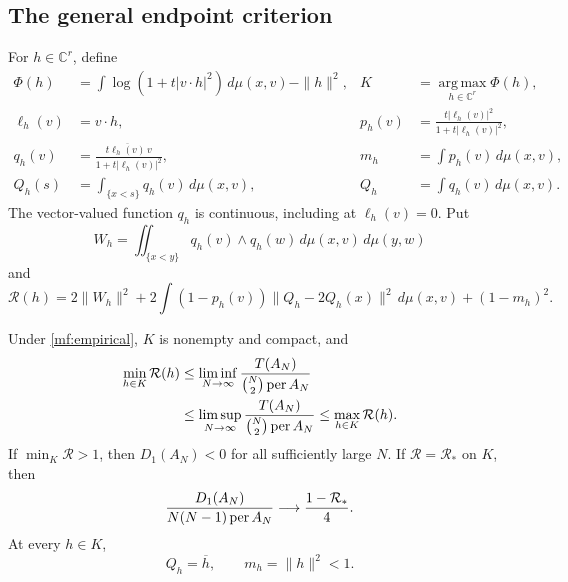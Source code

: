 \subsection{The general endpoint criterion}

For \(h\in\mathbb C^r\), define
\begin{align}
 \Phi(h)&=\int\log(1+t|v\cdot h|^2)\,d\mu(x,v)-\|h\|^2,
       &K&=\operatorname*{arg\,max}_{h\in\mathbb C^r}\Phi(h),\label{mf:potential}\\
 \ell_h(v)&=v\cdot h,
       &p_h(v)&=\frac{t|\ell_h(v)|^2}{1+t|\ell_h(v)|^2},\label{mf:p}\\
 q_h(v)&=\frac{t\overline{\ell_h(v)}\,v}{1+t|\ell_h(v)|^2},
       &m_h&=\int p_h(v)\,d\mu(x,v),\label{mf:q}\\
 Q_h(s)&=\int_{\{x<s\}}q_h(v)\,d\mu(x,v),
       &Q_h&=\int q_h(v)\,d\mu(x,v).\label{mf:prefix}
\end{align}
The vector-valued function \(q_h\) is continuous, including at
\(\ell_h(v)=0\). Put
\begin{equation}\label{mf:ordered-wedge}
 W_h=\iint_{\{x<y\}}q_h(v)\wedge q_h(w)\,
                       d\mu(x,v)\,d\mu(y,w)
\end{equation}
and
\begin{equation}\label{mf:score}
 \mathcal R(h)=2\|W_h\|^2+
 2\int(1-p_h(v))\|Q_h-2Q_h(x)\|^2\,d\mu(x,v)
 +(1-m_h)^2.
\end{equation}

\begin{theorem}\label{mf:criterion}
Under \eqref{mf:empirical}, \(K\) is nonempty and compact, and
\begin{align}
 \min_{h\in K}\mathcal R(h)
 &\le\liminf_{N\to\infty}\frac{T(A_N)}{\binom N2\operatorname{per} A_N}\notag\\
 &\le\limsup_{N\to\infty}\frac{T(A_N)}{\binom N2\operatorname{per} A_N}
 \le\max_{h\in K}\mathcal R(h).\label{mf:criterion-bounds}
\end{align}
If \(\min_K\mathcal R>1\), then \(D_1(A_N)<0\) for all sufficiently
large \(N\). If \(\mathcal R=\mathcal R_*\) on \(K\), then
\begin{equation}\label{mf:criterion-limit}
 \frac{D_1(A_N)}{N(N-1)\operatorname{per} A_N}\longrightarrow
                  \frac{1-\mathcal R_*}{4}.
\end{equation}
At every \(h\in K\),
\begin{equation}\label{mf:stationarity}
 Q_h=\overline h,\qquad m_h=\|h\|^2<1.
\end{equation}
\end{theorem}

